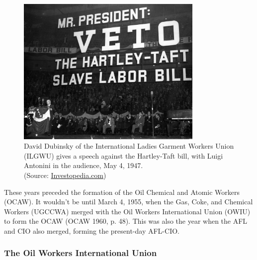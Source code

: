 \documentclass[12pt]{article}
\newcommand{\imageWidth}{0.8\textwidth}
\begin{document}
\begin{figure}[ht]
  \centering
  \includegraphics[width=\imageWidth]{images/slave_labor_bill}
  \captionsetup{justification=centering, singlelinecheck=false, margin=2cm} 
  \caption[Anti-Hartley-Taft Rally]{David Dubinsky of the International Ladies Garment Workers Union (ILGWU) gives a speech against the Hartley-Taft bill, with Luigi Antonini in the audience, May 4, 1947.\\ (Source: \href{https://www.investopedia.com/thmb/VcswppMRTl8IqMbgLRqdigfIGvs=/1500x0/filters:no_upscale():max_bytes(150000):strip_icc()/5278798677_0429e6aa05_k-7b6b81bdbbe44cdb929c08c7da9f8d29.jpg}{Investopedia.com}) \nocite{investopediaMrPresidentVeto}}
  \label{fig:slave_labor_bill}
\end{figure}

These years preceded the formation of the Oil Chemical and Atomic Workers (OCAW). It wouldn’t be until March 4, 1955, when the Gas, Coke, and Chemical Workers (UGCCWA) merged with the Oil Workers International Union (OWIU) to form the OCAW (OCAW 1960, p. 48). This was also the year when the AFL and CIO also merged, forming the present-day AFL-CIO.

\subsubsection{The Oil Workers International Union}
\end{document}
